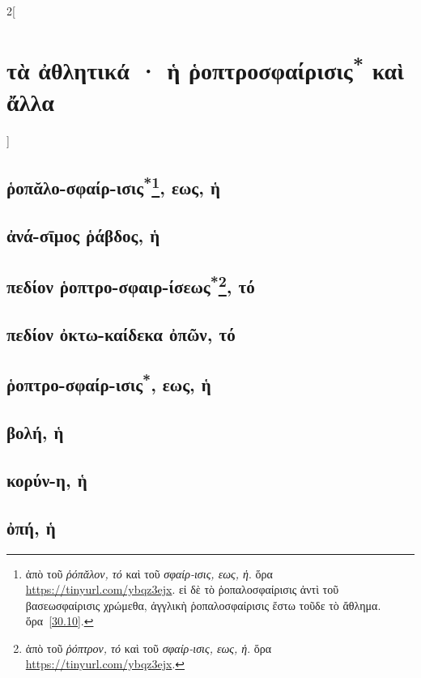 \documentclass{book}
\begin{document}
\begin{multicols}{2}[\section{τὰ ἀθλητικά · ἡ ῥοπτροσφαίρισις\textsuperscript{*} καὶ ἄλλα}]
\subsection{ῥοπᾰλο-σφαίρ-ισις\textsuperscript{*}\protect\footnote{ἀπὸ τοῦ \emph{ῥόπᾰλον, τό} καὶ τοῦ \emph{σφαίρ-ισις, εως, ἡ}. 
ὅρα \url{https://tinyurl.com/ybqz3ejx}. εἰ δὲ τὸ ῥοπαλοσφαίρισις ἀντὶ τοῦ βασεωσφαίρισις χρώμεθα, ἀγγλικὴ ῥοπαλοσφαίρισις ἔστω τοῦδε τὸ ἄθλημα. ὅρα~\ref{30.10}.}, εως, ἡ}
 \label{32.1}
\subsection{ἀνά-σῑμος ῥάβδος, ἡ}
\subsection{πεδίον ῥοπτρο-σφαιρ-ίσεως\textsuperscript{*}\protect\footnote{ἀπὸ τοῦ \emph{ῥόπτρον, τό} καὶ τοῦ \emph{σφαίρ-ισις, εως, ἡ}. ὅρα \url{https://tinyurl.com/ybqz3ejx}.}, τό}
\subsection{πεδίον ὀκτω-καίδεκα ὀπῶν, τό}
\subsection{ῥοπτρο-σφαίρ-ισις\textsuperscript{*\number\value{footnote}}, εως, ἡ}
\subsection{βολή, ἡ}
\subsection{κορύν-η, ἡ}
\subsection{ὀπή, ἡ}

\end{multicols}
\end{document}
